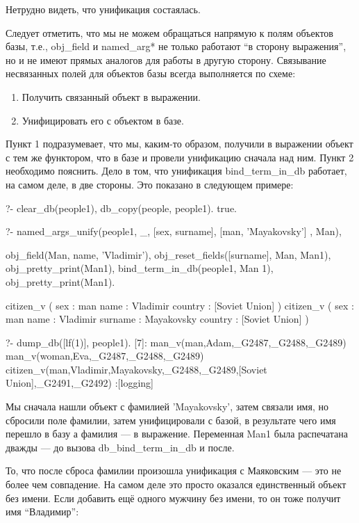 \documentclass[a4paper]{book}
\def\te{т.\thinspace е.}
\def\na{named\_arg*}
\begin{document}
Нетрудно видеть, что унификация состаялась.

Следует отметить, что мы не можем обращаться напрямую к полям
объектов базы, \te, obj\_field и \na{} не только работают ``в
сторону выражения'', но и не имеют прямых аналогов для работы в
другую сторону. Связывание несвязанных полей для объектов базы
всегда выполняется по схеме:

\begin{enumerate}
\item Получить связанный объект в выражении.
\item Унифицировать его с объектом в базе.
\end{enumerate}

Пункт 1 подразумевает, что мы, каким-то образом, получили в
выражении объект с тем же функтором, что в базе и провели
унификацию сначала над ним. Пункт 2 необходимо пояснить. Дело в
том, что унификация bind\_term\_in\_db работает, на самом деле, в
две стороны. Это показано в следующем примере:

\begin{example}{}{}
?- clear_db(people1), db_copy(people, people1).
true.

?- named_args_unify(people1, _, 
      [sex, surname], [man, 'Mayakovsky'] , Man), 

   obj_field(Man, name, 'Vladimir'), 
   obj_reset_fields([surname], Man, Man1), 
   obj_pretty_print(Man1), 
   bind_term_in_db(people1, Man 1), 
   obj_pretty_print(Man1).

citizen_v ( 
  sex : man 
  name : Vladimir 
  country : [Soviet Union] 
) 
citizen_v ( 
  sex : man 
  name : Vladimir 
  surname : Mayakovsky 
  country : [Soviet Union] 
) 

?- dump_db([lf(1)], people1).
[7]: man_v(man,Adam,_G2487,_G2488,_G2489) 
man_v(woman,Eva,_G2487,_G2488,_G2489) 
citizen_v(man,Vladimir,Mayakovsky,_G2488,_G2489,[Soviet Union],_G2491,_G2492)                                                        
 :[logging]
\end{example}

Мы сначала нашли объект с фамилией 'Mayakovsky', затем связали
имя, но сбросили поле фамилии, затем унифицировали с базой, в
результате чего имя перешло в базу а фамилия --- в
выражение. Переменная Man1 была распечатана дважды --- до вызова
db\_bind\_term\_in\_db и после.

То, что после сброса фамилии произошла унификация с Маяковским
--- это не более чем совпадение. На самом деле это просто
оказался единственный объект без имени. Если добавить ещё одного
мужчину без имени, то он тоже получит имя ``Владимир'':
\end{document}
